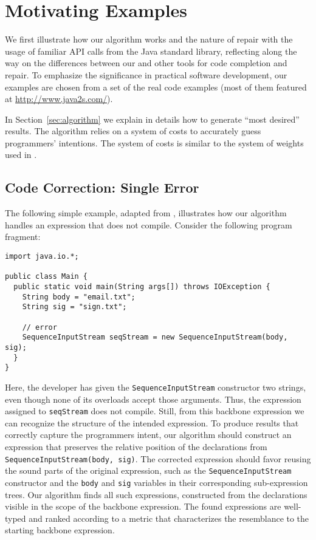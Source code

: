 \section{Motivating Examples}
\label{sec:examples}

We first illustrate how our algorithm works and the nature of repair with the usage of familiar API calls from the Java standard library, reflecting along the way on the differences between our and other tools for code completion and repair. To emphasize the significance in practical software development, our examples are chosen from a set of the real code examples (most of them featured at \url{http://www.java2s.com/}{}).

In Section~\ref{sec:algorithm} we explain in details how to generate ``most desired'' results. The algorithm relies on a system of costs to accurately guess programmers' intentions. The system of costs is similar to the system of weights used in \cite{GveroETAL13CompleteCompletionTypesWeights}.

\subsection{Code Correction: Single Error}

The following simple example, adapted from \cite{GveroETAL13CompleteCompletionTypesWeights}, illustrates how our algorithm handles an expression that does not compile. Consider the following program fragment:
\begin{lstlisting}
import java.io.*;

public class Main {
  public static void main(String args[]) throws IOException {
    String body = "email.txt";
    String sig = "sign.txt";
    
    // error
    SequenceInputStream seqStream = new SequenceInputStream(body, sig);
  }
} 
\end{lstlisting}
Here, the developer has given the \lstinline{SequenceInputStream} constructor two strings, even though none of its overloads accept those arguments. Thus, the expression assigned to \lstinline{seqStream} does not compile. Still, from this backbone expression we can recognize the structure of the intended expression. To produce results that correctly capture the programmers intent, our algorithm should construct an expression that preserves the relative position of the declarations from \lstinline{SequenceInputStream(body, sig)}. The corrected expression should favor reusing the sound parts of the original expression, such as the \lstinline{SequenceInputStream} constructor and the \lstinline{body} and \lstinline{sig} variables in their corresponding sub-expression trees. Our algorithm finds all such expressions, constructed from the declarations visible in the scope of the backbone expression. The found expressions are well-typed and ranked according to a metric that characterizes the resemblance to the starting backbone expression.

